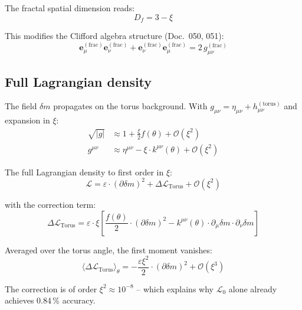 The fractal spatial dimension reads:
\begin{equation}
    D_f = 3 - \xi
\end{equation}

This modifies the Clifford algebra structure (Doc.~050, 051):
\begin{equation}
    \mathbf{e}_\mu^{(\mathrm{frac})} \mathbf{e}_\nu^{(\mathrm{frac})}
    + \mathbf{e}_\nu^{(\mathrm{frac})} \mathbf{e}_\mu^{(\mathrm{frac})}
    = 2\, g_{\mu\nu}^{(\mathrm{frac})}
\end{equation}

\subsection{Full Lagrangian density}

The field $\delta m$ propagates on the torus background. With
$g_{\mu\nu} = \eta_{\mu\nu} + h_{\mu\nu}^{(\mathrm{torus})}$
and expansion in $\xi$:
\begin{align}
    \sqrt{|g|} &\approx 1 + \frac{\xi}{2} f(\theta) + \mathcal{O}(\xi^2) \\
    g^{\mu\nu} &\approx \eta^{\mu\nu} - \xi \cdot k^{\mu\nu}(\theta)
    + \mathcal{O}(\xi^2)
\end{align}

The full Lagrangian density to first order in $\xi$:
\begin{equation}
    \mathcal{L} = \varepsilon \cdot (\partial\delta m)^2
    + \Delta\mathcal{L}_{\mathrm{Torus}} + \mathcal{O}(\xi^2)
\end{equation}

with the correction term:
\begin{equation}
    \boxed{
    \Delta\mathcal{L}_{\mathrm{Torus}} = \varepsilon \cdot \xi \left[
    \frac{f(\theta)}{2} \cdot (\partial\delta m)^2
    - k^{\mu\nu}(\theta) \cdot \partial_\mu\delta m \cdot \partial_\nu\delta m
    \right]
    }
    \label{eq:deltaL}
\end{equation}

Averaged over the torus angle, the first moment vanishes:
\begin{equation}
    \langle \Delta\mathcal{L}_{\mathrm{Torus}} \rangle_\theta
    = -\frac{\varepsilon \xi^2}{2} \cdot (\partial\delta m)^2
    + \mathcal{O}(\xi^3)
\end{equation}

The correction is of order $\xi^2 \approx 10^{-8}$ -- which explains
why $\mathcal{L}_0$ alone already achieves 0.84\,\% accuracy.

